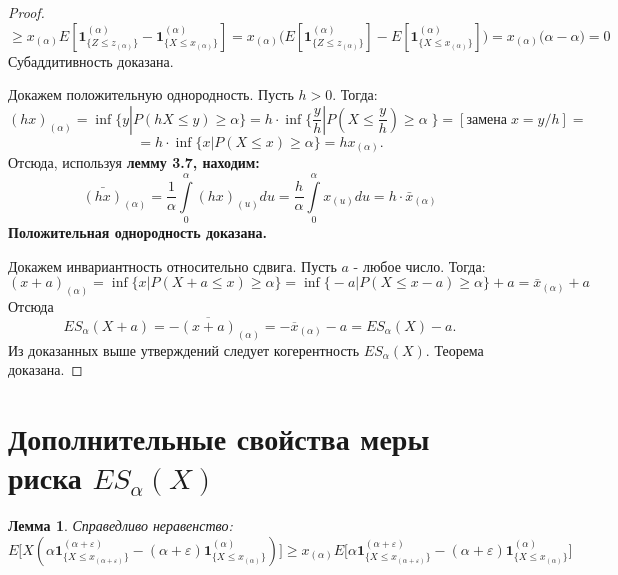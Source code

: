 \documentclass[14pt,a4paper]{article}
\theoremstyle{plain}
\newtheorem{Lemma}{Лемма}[section]
\theoremstyle{definition}
\begin{document}
\begin{proof}
$$
\ge x_{(\alpha)}E[\mathbf{1}^{(\alpha)}_{\{Z \le z_{(\alpha)}  \}} - \mathbf{1}^{(\alpha)}_{\{X \le x_{(\alpha)}  \}}]
=x_{(\alpha)}\Big(E[\mathbf{1}^{(\alpha)}_{\{Z \le z_{(\alpha)}  \}}] - E[\mathbf{1}^{(\alpha)}_{\{X \le x_{(\alpha)}  \}}]\Big) =x_{(\alpha)}\Big(\alpha - \alpha\Big) = 0
$$
Субаддитивность доказана.

 Докажем положительную однородность. Пусть $h>0$. Тогда:
$$
(hx)_{(\alpha)} = \inf\Big\{y|P(hX \le y) \ge \alpha  \Big\} = h \cdot \inf\Big\{\frac{y}{h}|P(X \le \frac{y}{h}) \ge \alpha\;  \Big\}= [\mbox{замена}\;x = {y}/{h}]=
$$
$$
=h\cdot \inf\Big\{x|P(X \le x) \ge \alpha  \Big\} = h x_{(\alpha)}.
$$
Отсюда, используя \bf{лемму 3.7}\rm, находим:
$$
\bar{(hx)}_{(\alpha)} = \frac{1}{\alpha}\int\limits^\alpha_0 (hx)_{(u)}du = \frac{h}{\alpha}\int\limits^\alpha_0 x_{(u)}du = h \cdot \bar{x}_{(\alpha)}
$$
Положительная однородность доказана.

Докажем инвариантность относительно сдвига.
Пусть $a$ - любое число. Тогда:
$$
(x+a)_{(\alpha)} = \inf \Big\{x|P(X+a \le x) \ge \alpha  \Big\} = \inf \Big\{-a|P(X \le x-a) \ge \alpha  \Big\} +a = \bar{x}_{(\alpha)} + a
$$
Отсюда
$$
ES_\alpha(X+a) = -\overline{(x+a)}_{(\alpha)} = - \overline{x}_{(\alpha)} - a = ES_\alpha (X) - a.
$$
Из доказанных выше утверждений следует когерентность $ES_\alpha (X).$
Теорема доказана.
\end{proof}

 \section{Дополнительные свойства меры риска $ES_\alpha(X)$}


\begin{Lemma}
Справедливо неравенство:
\begin{equation}
E\Big[X(\alpha\mathbf{1}^{(\alpha + \varepsilon)}_{\{X \le x_{(\alpha + \varepsilon)}  \} } - (\alpha + \varepsilon)\mathbf{1}^{(\alpha)}_{\{X \le x_{(\alpha)}  \} } )\Big] \ge
x_{(\alpha)}E\Big[\alpha\mathbf{1}^{(\alpha + \varepsilon)}_{\{X \le x_{(\alpha + \varepsilon)}  \} } - (\alpha + \varepsilon)\mathbf{1}^{(\alpha)}_{\{X \le x_{(\alpha)}  \} }   \Big]
\end{equation}
\end{Lemma}
\end{document}
